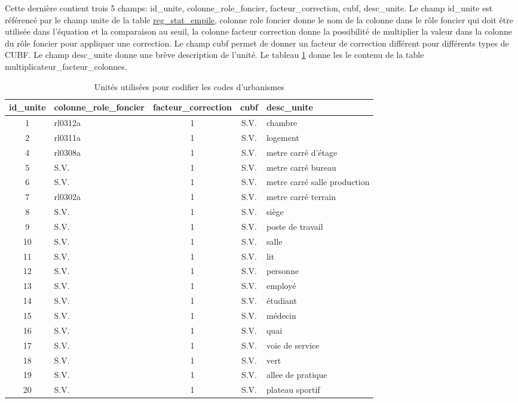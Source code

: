     Cette dernière contient trois 5 champs: id\_unite, colonne\_role\_foncier, facteur\_correction, cubf, desc\_unite. Le champ id\_unite est référencé par le champ unite de la table \underline{reg\_stat\_empile}, colonne role foncier donne le nom de la colonne dans le rôle foncier qui doit être utilisée dans l'équation et la comparaison au seuil, la colonne facteur correction donne la possibilité de multiplier la valeur dans la colonne du rôle foncier pour appliquer une correction. Le champ cubf permet de donner un facteur de correction différent pour différents types de \ac{CUBF}. Le champ desc\_unite donne une brève description de l'unité. Le tableau \ref{tab:unite_pertinentes_minimum_stat} donne les le contenu de la table multiplicateur\_facteur\_colonnes.\par
    \begin{table}[h]
    \centering
        \begin{tabular}{c l c c p{3cm}}
            \hline
            id\_unite & colonne\_role\_foncier & facteur\_correction & cubf & desc\_unite \\ \hline
            1 & rl0312a & 1 & S.V. & chambre\\
            2 & rl0311a & 1 & S.V. & logement \\
            4 & rl0308a & 1 & S.V. & metre carré d'étage\\
            5 & S.V. & 1 & S.V. & metre carré bureau\\
            6 & S.V. & 1 & S.V. & metre carré salle production \\
            7 & rl0302a & 1 & S.V. & metre carré terrain\\
            8 & S.V. & 1 & S.V. & siège \\
            9 & S.V. & 1 & S.V. & poste de travail \\
            10 &S.V. & 1 & S.V. & salle \\
            11 & S.V. & 1 & S.V. & lit \\
            12 & S.V. & 1 & S.V. & personne \\
            13 & S.V. & 1 & S.V. & employé \\
            14 & S.V. & 1 & S.V. & étudiant \\
            15 & S.V. & 1 & S.V. & médecin \\
            16 & S.V. & 1 & S.V. & quai \\
            17 & S.V. & 1 & S.V. & voie de service \\
            18 & S.V. & 1 & S.V. & vert \\
            19 & S.V. & 1 & S.V. & allee de pratique \\
            20 & S.V. & 1 & S.V. & plateau sportif \\ \hline
        \end{tabular}
        \caption{Unités utilisées pour codifier les codes d'urbanismes}\label{tab:unite_pertinentes_minimum_stat}
    \end{table}
